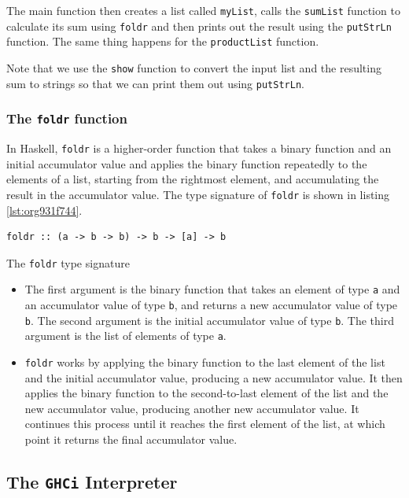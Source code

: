 \documentclass[a4paper, titlepage, twoside]{article}
\begin{document}
The main function then creates a list called \texttt{myList}, calls the \texttt{sumList} function to calculate its sum using \texttt{foldr} and then prints out the result using the \texttt{putStrLn} function. The same thing happens for the \texttt{productList} function.

Note that we use the \texttt{show} function to convert the input list and the resulting sum to strings so that we can print them out using \texttt{putStrLn}.

\subsubsection{The \texttt{foldr} function}
\label{sec:org57c5e7e}

In Haskell, \texttt{foldr} is a higher-order function that takes a binary function and an initial accumulator value and applies the binary function repeatedly to the elements of a list, starting from the rightmost element, and accumulating the result in the accumulator value. The type signature of \texttt{foldr} is shown in listing \ref{lst:org931f744}.

\begin{listing}[htbp]
\begin{verbatim}
foldr :: (a -> b -> b) -> b -> [a] -> b
\end{verbatim}
\caption{\label{lst:org931f744}The \texttt{foldr} type signature}
\end{listing}

\begin{itemize}
\item The first argument is the binary function that takes an element of type \texttt{a} and an accumulator value of type \texttt{b}, and returns a new accumulator value of type \texttt{b}. The second argument is the initial accumulator value of type \texttt{b}. The third argument is the list of elements of type \texttt{a}.

\item \texttt{foldr} works by applying the binary function to the last element of the list and the initial accumulator value, producing a new accumulator value. It then applies the binary function to the second-to-last element of the list and the new accumulator value, producing another new accumulator value. It continues this process until it reaches the first element of the list, at which point it returns the final accumulator value.
\end{itemize}

\subsection{The \texttt{GHCi} Interpreter}
\label{sec:orgeace5e5}
\end{document}
